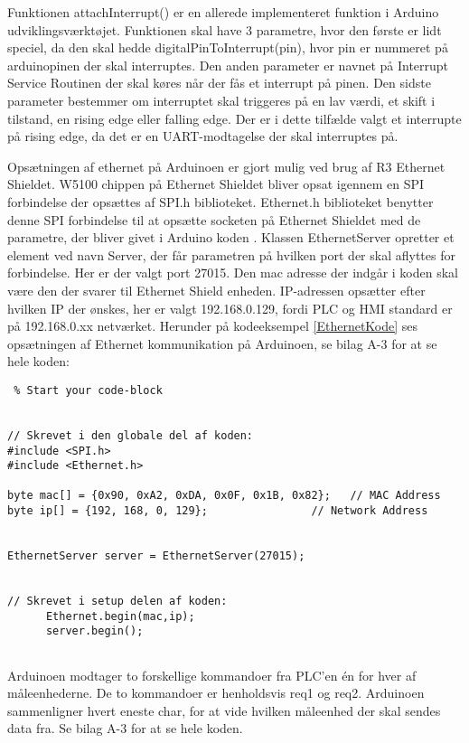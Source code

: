 Funktionen attachInterrupt() er en allerede implementeret funktion i Arduino udviklingsværktøjet. Funktionen skal have 3 parametre, hvor den første er lidt speciel, da den skal hedde digitalPinToInterrupt(pin), hvor pin er nummeret på arduinopinen der skal interruptes. Den anden parameter er navnet på Interrupt Service Routinen der skal køres når der fås et interrupt på pinen. Den sidste parameter bestemmer om interruptet skal triggeres på en lav værdi, et skift i tilstand, en rising edge eller falling edge. Der er i dette tilfælde valgt et interrupte på rising edge, da det er en UART-modtagelse der skal interruptes på. 

Opsætningen af ethernet på Arduinoen er gjort mulig ved brug af R3 Ethernet Shieldet. W5100 chippen på Ethernet Shieldet bliver opsat igennem en SPI forbindelse der opsættes af SPI.h biblioteket. Ethernet.h biblioteket benytter denne SPI forbindelse til at opsætte socketen på Ethernet Shieldet med de parametre, der bliver givet i Arduino koden \cite{Ethernet}. Klassen EthernetServer opretter et element ved navn Server, der får parametren på hvilken port der skal aflyttes for forbindelse. Her er der valgt port 27015. Den mac adresse der indgår i koden skal være den der svarer til Ethernet Shield enheden. IP-adressen opsætter efter hvilken IP der ønskes, her er valgt 192.168.0.129, fordi PLC og HMI standard er på 192.168.0.xx netværket. Herunder på kodeeksempel \ref{EthernetKode} ses opsætningen af Ethernet kommunikation på Arduinoen, se bilag A-3 for at se hele koden:


\begin{lstlisting} % Start your code-block


// Skrevet i den globale del af koden:
#include <SPI.h>
#include <Ethernet.h>

byte mac[] = {0x90, 0xA2, 0xDA, 0x0F, 0x1B, 0x82};   // MAC Address
byte ip[] = {192, 168, 0, 129};                // Network Address


EthernetServer server = EthernetServer(27015);


// Skrevet i setup delen af koden:
      Ethernet.begin(mac,ip);
      server.begin();


\end{lstlisting}

Arduinoen modtager to forskellige kommandoer fra PLC'en én for hver af måleenhederne. De to kommandoer er henholdsvis req1 og req2. Arduinoen sammenligner hvert eneste char, for at vide hvilken måleenhed der skal sendes data fra. Se bilag A-3 for at se hele koden. 

